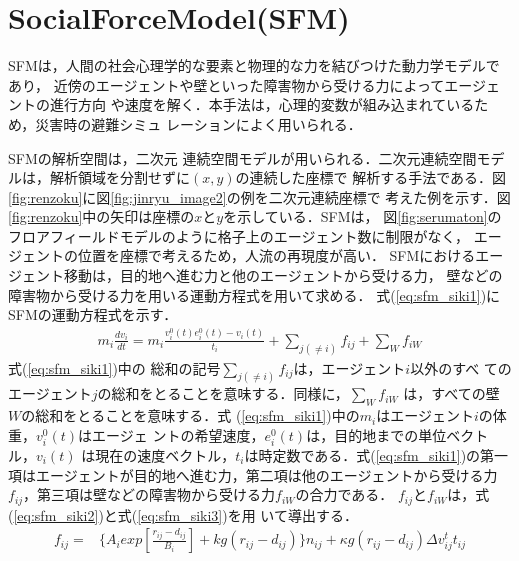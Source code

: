 \section{SocialForceModel(SFM)}
SFMは，人間の社会心理学的な要素と物理的な力を結びつけた動力学モデルであり，
近傍のエージェントや壁といった障害物から受ける力によってエージェントの進行方向
や速度を解く．本手法は，心理的変数が組み込まれているため，災害時の避難シミュ
レーションによく用いられる\cite{21_Isozaki}\cite{ando_sfm}．

SFMの解析空間は，二次元
連続空間モデルが用いられる．二次元連続空間モデルは，解析領域を分割せずに$(x,y)$の連続した座標で
解析する手法である．図\ref{fig:renzoku}に図\ref{fig:jinryu_image2}の例を二次元連続座標で
考えた例を示す．図\ref{fig:renzoku}中の矢印は座標の$x$と$y$を示している．SFMは，
図\ref{fig:serumaton}のフロアフィールドモデルのように格子上のエージェント数に制限がなく，
エージェントの位置を座標で考えるため，人流の再現度が高い．
SFMにおけるエージェント移動は，目的地へ進む力と他のエージェントから受ける力，
壁などの障害物から受ける力を用いる運動方程式を用いて求める．
式(\ref{eq:sfm_siki1})にSFMの運動方程式を示す．
%
\begin{eqnarray}
 m_i \frac{dv_i}{dt} = m_i \frac{v_i^0(t)e_i^0(t)-v_i(t)}{t_i}
 +\sum_{j(\neq i)}f_{ij}+\sum_{W}f_{iW}
 \label{eq:sfm_siki1}
\end{eqnarray}
%
式(\ref{eq:sfm_siki1})中の
総和の記号$\sum_{j(\neq i)}f_{ij}$は，エージェント$i$以外のすべ
てのエージェント$j$の総和をとることを意味する．同様に，$\sum_{W}f_{iW}$
は，すべての壁$W$の総和をとることを意味する．式
(\ref{eq:sfm_siki1})中の$m_i$はエージェント$i$の体重，$v_i^0(t)$はエージェ
ントの希望速度，$e_i^0(t)$は，目的地までの単位ベクトル，$v_i(t)$
は現在の速度ベクトル，$t_i$は時定数である．式(\ref{eq:sfm_siki1})の第一
項はエージェントが目的地へ進む力，第二項は他のエージェントから受ける力
$f_{ij}$，第三項は壁などの障害物から受ける力$f_{iW}$の合力である．
$f_{ij}$と$f_{iW}$は，式(\ref{eq:sfm_siki2})と式(\ref{eq:sfm_siki3})を用
いて導出する．
%
\begin{eqnarray}
 f_{ij} = & \{A_i exp[\frac{r_{ij} - d_{ij}}{B_i}]
  + kg(r_{ij} - d_{ij})\} n_{ij}
+ \kappa g (r_{ij} - d_{ij}) \Delta
  v^t_{ij} t_{ij}
 \label{eq:sfm_siki2}
\end{eqnarray}
